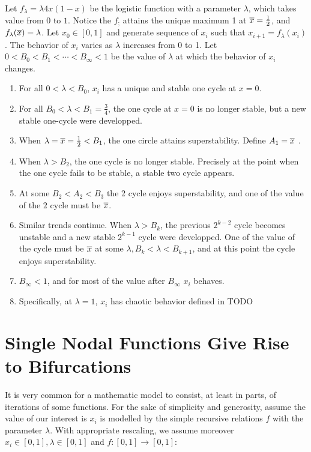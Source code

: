 \begin{observation}\label{th:logistic_bifurcation}
	Let $f_{\lambda} = \lambda 4x(1-x) $ be the logistic function with a parameter $\lambda$, which takes value from $0$ to $1$. 
	Notice the $f_{;}$ attains the unique maximum 1 at $\overline{x} = \frac{1}{2}$, and $f_{\lambda}(\overline{x}) = \lambda$.
	Let $x_0 \in [0,1]$ and generate sequence of $x_i$ such that $x_{i+1} = f_{\lambda}(x_i)$.
	The behavior of $x_i$ varies as $\lambda$ increases from 0 to 1. Let $0 < B_0 < B_1 < \cdots < B_{\infty} < 1$ be the value of $\lambda$ at which the behavior of $x_i$ changes.

	\begin{enumerate}
		\item For all $0 < \lambda < B_0$, $x_i$ has a unique and stable one cycle at $x=0$.
		\item For all $B_0 <\lambda < B_1 = \frac{3}{4}$, the one cycle at $x=0$ is no longer stable, but a new stable one-cycle were developped.
		\item When $\lambda = \overline{x} = \frac{1}{2}< B_1$, the one circle attains superstability. Define $A_1 = \overline{x}$ .
		\item When $\lambda > B_2$, the one cycle is no longer stable. Precisely at the point when the one cycle fails to be stable, a stable two cycle appears.
		\item At some $B_2 <A_2 < B_3$ the 2 cycle enjoys superstability, and one of the value of the $2$ cycle must be $\overline{x}$.
		\item Similar trends continue. When $\lambda > B_k$, the previous $2^{k-2}$ cycle becomes unstable and a new stable $2^{k-1}$ cycle were developped. One of the value of the cycle must be $\overline{x}$ at some $\lambda, B_k <\lambda < B_{k+1}$, and at this point the cycle enjoys superstability.
		\item $B_{\infty} < 1$, and for most of the value after $B_{\infty}$ $x_i$ behaves. 
		\item Specifically, at $\lambda = 1$, $x_i$ has chaotic behavior defined in TODO
	\end{enumerate}

\end{observation}

\section{Single Nodal Functions Give Rise to Bifurcations}

It is very common for a mathematic model to consist, at least in parts, of iterations of some functions.
For the sake of simplicity and generosity, assume the value of our interest is $x_i$ is modelled by the simple recursive relations $f$ with the parameter $\lambda$. With appropriate rescaling, we assume moreover $x_i \in [0,1], \lambda \in [0,1]$ and $f: [0,1] \rightarrow [0,1]$:


